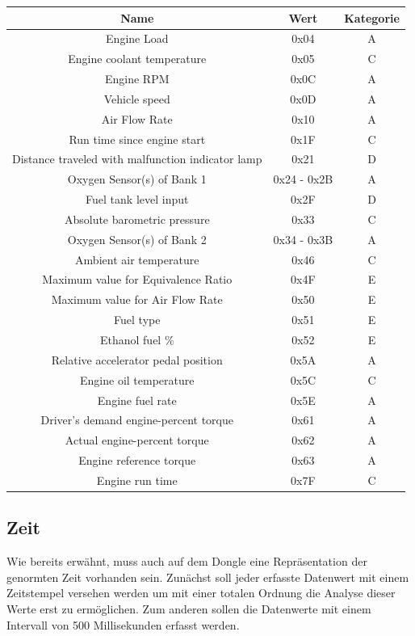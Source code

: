 		\begin{center}
			\begin{tabular}{|c|c|c|}
				\hline 
				Name & Wert & Kategorie \\ 
				\hline
				Engine Load & 0x04 & A \\ 
				\hline
				Engine coolant temperature & 0x05 & C \\ 
				\hline 
				Engine RPM & 0x0C & A \\ 
				\hline 
				Vehicle speed & 0x0D & A \\ 
				\hline
				Air Flow Rate & 0x10 & A\\
				\hline 
				Run time since engine start & 0x1F & C \\ 
				\hline 
				Distance traveled with malfunction indicator lamp & 0x21 & D \\ 
				\hline
				Oxygen Sensor(s) of Bank 1 & 0x24 - 0x2B & A \\
				\hline 
				Fuel tank level input & 0x2F & D \\ 
				\hline 
				Absolute barometric pressure & 0x33 & C \\ 
				\hline
				Oxygen Sensor(s) of Bank 2 & 0x34 - 0x3B & A \\ 
				\hline
				Ambient air temperature & 0x46 & C \\ 
				\hline
				Maximum value for Equivalence Ratio & 0x4F & E \\
				\hline
				Maximum value for Air Flow Rate & 0x50 & E \\
				\hline 
				Fuel type & 0x51 & E \\ 
				\hline 
				Ethanol fuel \% & 0x52 & E \\ 
				\hline 
				Relative accelerator pedal position & 0x5A & A \\ 
				\hline 
				Engine oil temperature & 0x5C & C \\ 
				\hline 
				Engine fuel rate & 0x5E & A \\ 
				\hline 
				Driver's demand engine-percent torque & 0x61 & A \\ 
				\hline 
				Actual engine-percent torque & 0x62 & A \\ 
				\hline 
				Engine reference torque & 0x63 & A \\ 
				\hline 
				Engine run time & 0x7F & C \\ 
				\hline 
			\end{tabular} 
		\end{center}
		

\subsection{Zeit}
Wie bereits erwähnt, muss auch auf dem Dongle eine Repräsentation der genormten Zeit vorhanden sein. Zunächst soll jeder erfasste Datenwert mit einem Zeitstempel versehen werden um mit einer totalen Ordnung die Analyse dieser Werte erst zu ermöglichen. Zum anderen sollen die Datenwerte mit einem Intervall von 500 Millisekunden erfasst werden.
